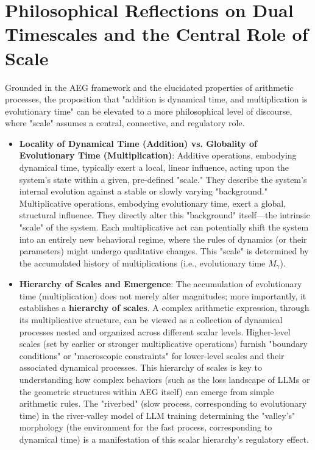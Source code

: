 \documentclass{article}
\begin{document}
\section{Philosophical Reflections on Dual Timescales and the Central Role of Scale}

Grounded in the AEG framework and the elucidated properties of arithmetic processes, the proposition that "addition is dynamical time, and multiplication is evolutionary time" can be elevated to a more philosophical level of discourse, where "scale" assumes a central, connective, and regulatory role.

\begin{itemize}
    \item \textbf{Locality of Dynamical Time (Addition) vs. Globality of Evolutionary Time (Multiplication)}:
    Additive operations, embodying dynamical time, typically exert a local, linear influence, acting upon the system's state within a given, pre-defined "scale." They describe the system's internal evolution against a stable or slowly varying "background."
    Multiplicative operations, embodying evolutionary time, exert a global, structural influence. They directly alter this "background" itself—the intrinsic "scale" of the system. Each multiplicative act can potentially shift the system into an entirely new behavioral regime, where the rules of dynamics (or their parameters) might undergo qualitative changes. This "scale" is determined by the accumulated history of multiplications (i.e., evolutionary time $M_\gamma$).

    \item \textbf{Hierarchy of Scales and Emergence}:
    The accumulation of evolutionary time (multiplication) does not merely alter magnitudes; more importantly, it establishes a \textbf{hierarchy of scales}. A complex arithmetic expression, through its multiplicative structure, can be viewed as a collection of dynamical processes nested and organized across different scalar levels.
    Higher-level scales (set by earlier or stronger multiplicative operations) furnish "boundary conditions" or "macroscopic constraints" for lower-level scales and their associated dynamical processes. This hierarchy of scales is key to understanding how complex behaviors (such as the loss landscape of LLMs \cite{Liu2025NTL} or the geometric structures within AEG itself) can emerge from simple arithmetic rules. The "riverbed" (slow process, corresponding to evolutionary time) in the river-valley model of LLM training determining the "valley's" morphology (the environment for the fast process, corresponding to dynamical time) \cite{Liu2025NTL} is a manifestation of this scalar hierarchy's regulatory effect.


\end{itemize}
\end{document}

